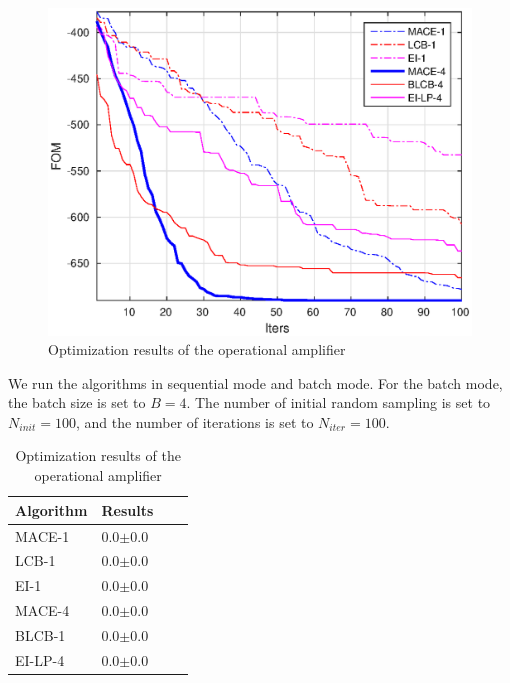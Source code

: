 \begin{figure}[]
\vskip 0.2in
\begin{center}
\centerline{\includegraphics[width=\columnwidth]{./img/mean_DAC2014.eps}}
\caption{Optimization results of the operational amplifier}
\label{fig:resDAC2014}
\end{center}
\vskip -0.2in
\end{figure}

We run the algorithms in sequential mode and batch mode. For the batch
mode, the batch size is set to $B = 4$. The number of initial random sampling is set
to $N_{init} = 100$, and the number of iterations is set to $N_{iter} = 100$.


\begin{table}[]
    \centering
    \caption{Optimization results of the operational amplifier}
    \label{tab:result_opamp}
    \begin{tabular}{llll}
        \toprule
        Algorithm & Results     \\ \midrule
        MACE-1    & 0.0$\pm$0.0 \\
        LCB-1     & 0.0$\pm$0.0 \\
        EI-1      & 0.0$\pm$0.0 \\
        MACE-4    & 0.0$\pm$0.0 \\
        BLCB-1    & 0.0$\pm$0.0 \\
        EI-LP-4   & 0.0$\pm$0.0 \\
        \bottomrule
    \end{tabular}
\end{table}

